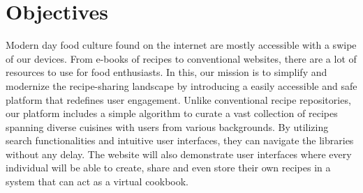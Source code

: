 \section{Objectives}


Modern day food culture found on the internet are mostly accessible with a swipe of our devices. From e-books of recipes to conventional websites, there are a lot of resources to use for food enthusiasts. In this, our mission is to simplify and modernize the recipe-sharing landscape by introducing a easily accessible and safe platform that redefines user engagement. Unlike conventional recipe repositories, our platform includes a simple algorithm to curate a vast collection of recipes spanning diverse cuisines with users from various backgrounds. By utilizing search functionalities and intuitive user interfaces, they can navigate the libraries without any delay. The website will also demonstrate user interfaces where every individual will be able to create, share and even store their own recipes in a system that can act as a virtual cookbook. 